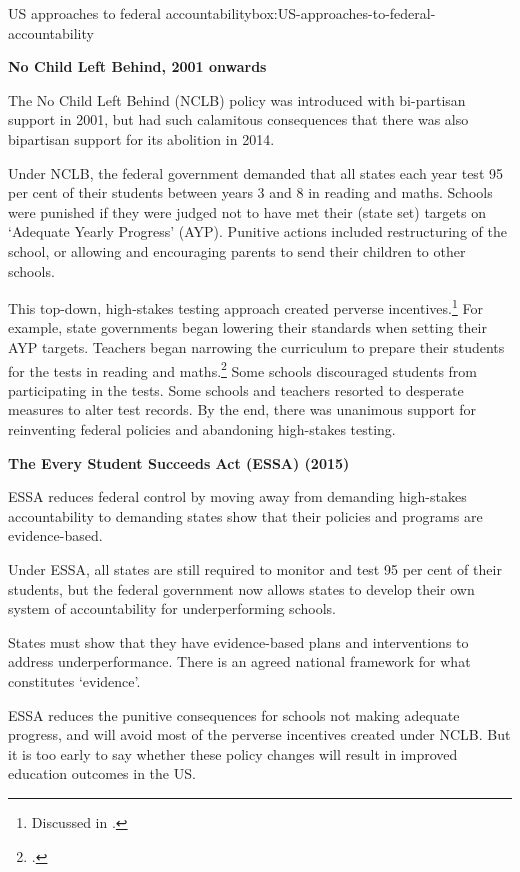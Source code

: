 \begin{bigbox}{US approaches to federal accountability}{box:US-approaches-to-federal-accountability}

\textbf{No Child Left Behind, 2001 onwards}

The No Child Left Behind (NCLB) policy was introduced with bi-partisan support in 2001, but had such calamitous consequences that there was also bipartisan support for its abolition in 2014.

Under NCLB, the federal government demanded that all states each year test 95 per cent of their students between years 3 and 8 in reading and maths. Schools were punished if they were judged not to have met their (state set) targets on `Adequate Yearly Progress' (AYP). Punitive actions included restructuring of the school, or allowing and encouraging parents to send their children to other schools.

This top-down, high-stakes testing approach created perverse incentives.\footnote{Discussed in \textcite[][39]{Goss2015TargetedTeachingHow}.}
For example, state governments began lowering their standards when setting their AYP targets. Teachers began narrowing the curriculum to prepare their students for the tests in reading and maths.\footcite{Jacob2010TheImpactofNoChildLeftBehind}
Some schools discouraged students from participating in the tests. Some schools and teachers resorted to desperate measures to alter test records.
By the end, there was unanimous support for reinventing federal policies and abandoning high-stakes testing.

\textbf{The Every Student Succeeds Act (ESSA) (2015)}

ESSA reduces federal control by moving away from demanding high-stakes accountability to demanding states show that their policies and programs are evidence-based.

Under ESSA, all states are still required to monitor and test 95 per cent of their students, but the federal government now allows states to develop their own system of accountability for underperforming schools.

States must show that they have evidence-based plans and interventions to address underperformance. There is an agreed national framework for what constitutes `evidence'.

ESSA reduces the punitive consequences for schools not making adequate progress, and will avoid most of the perverse incentives created under NCLB\@. But it is too early to say whether these policy changes will result in improved education outcomes in the US\@. 

\end{bigbox}

